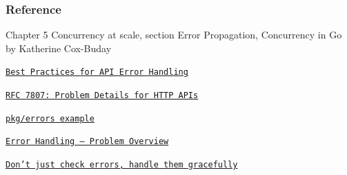 \documentclass[9pt]{beamer}
\newcommand{\myblue} [1] {{\color{blue}#1}}
\begin{document}
\begin{frame}[fragile]
\frametitle{Reference}


Chapter 5 Concurrency at scale, section Error Propagation, Concurrency in Go by Katherine Cox-Buday  


\myblue{\href{https://nordicapis.com/best-practices-api-error-handling/}{\texttt{Best Practices for API Error Handling}}}

\myblue{\href{https://tools.ietf.org/html/rfc7807}{\texttt{RFC 7807: Problem Details for HTTP APIs}}}

\myblue{\href{https://github.com/pkg/errors/blob/master/example_test.go}{\texttt{pkg/errors example}}}

\myblue{\href{https://go.googlesource.com/proposal/+/master/design/go2draft-error-handling-overview.md}{\texttt{Error Handling — Problem Overview}}}

\myblue{\href{https://dave.cheney.net/2016/04/27/dont-just-check-errors-handle-them-gracefully}{\texttt{Don’t just check errors, handle them gracefully}}}


\end{frame}
\end{document}
